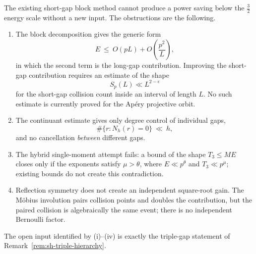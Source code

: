 \begin{remark}
\label{rem:sh-barrier}
The existing short-gap block method cannot produce a power saving below
the $\tfrac32$ energy scale without a new input.  The obstructions are
the following.
\begin{enumerate}
\item[(i)] The block decomposition gives the generic form
\[
 E\ \le\ O(pL)+O\!\left(\frac{p^2}{L}\right),
\]
in which the second term is the long-gap contribution.  Improving the
short-gap contribution requires an estimate of the shape
\[
 S_p(L)\ll L^{2-\epsilon}
\]
for the short-gap collision count inside an interval of length $L$.  No
such estimate is currently proved for the Ap\'ery projective orbit.
\item[(ii)] The continuant estimate gives only degree control of
individual gaps,
\[
 \#\{r:N_h(r)=0\}\ \ll\ h,
\]
and no cancellation \emph{between} different gaps.
\item[(iii)] The hybrid single-moment attempt fails: a bound of the
shape $T_3\le ME$ closes only if the exponents satisfy $\mu>\theta$,
where $E\ll p^{\theta}$ and $T_3\ll p^{\mu}$; existing bounds do not
create this contradiction.
\item[(iv)] Reflection symmetry does not create an independent
square-root gain.  The M\"obius involution pairs collision points and
doubles the contribution, but the paired collision is algebraically the
same event; there is no independent Bernoulli factor.
\end{enumerate}
The open input identified by (i)--(iv) is exactly the triple-gap
statement of Remark~\ref{rem:sh-triple-hierarchy}.
\end{remark}

